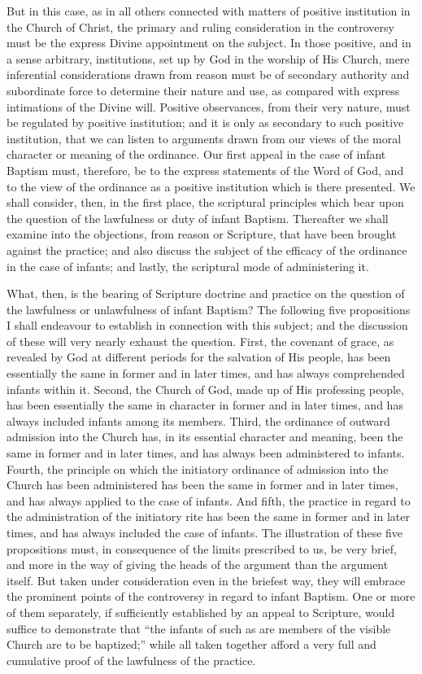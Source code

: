 \documentclass[]{book}
\begin{document}
But in this case, as in all others connected with matters of positive institution in the Church of Christ, the primary and ruling consideration in the controversy must be the express Divine appointment on the subject. In those positive, and in a sense arbitrary, institutions, set up by God in the worship of His Church, mere inferential considerations drawn from reason must be of secondary authority and subordinate force to determine their nature and use, as compared with express intimations of the Divine will. Positive observances, from their very nature, must be regulated by positive institution; and it is only as secondary to such positive institution, that we can listen to arguments drawn from our views of the moral character or meaning of the ordinance. Our first appeal in the case of infant Baptism must, therefore, be to the express statements of the Word of God, and to the view of the ordinance as a positive institution which is there presented. We shall consider, then, in the first place, the scriptural principles which bear upon the question of the lawfulness or duty of infant Baptism. Thereafter we shall examine into the objections, from reason or Scripture, that have been brought against the practice; and also discuss the subject of the efficacy of the ordinance in the case of infants; and lastly, the scriptural mode of administering it.

What, then, is the bearing of Scripture doctrine and practice on the question of the lawfulness or unlawfulness of infant Baptism? The following five propositions I shall endeavour to establish in connection with this subject; and the discussion of these will very nearly exhaust the question. First, the covenant of grace, as revealed by God at different periods for the salvation of His people, has been essentially the same in former and in later times, and has always comprehended infants within it. Second, the Church of God, made up of His professing people, has been essentially the same in character in former and in later times, and has always included infants among its members. Third, the ordinance of outward admission into the Church has, in its essential character and meaning, been the same in former and in later times, and has always been administered to infants. Fourth, the principle on which the initiatory ordinance of admission into the Church has been administered has been the same in former and in later times, and has always applied to the case of infants. And fifth, the practice in regard to the administration of the initiatory rite has been the same in former and in later times, and has always included the case of infants. The illustration of these five propositions must, in consequence of the limits prescribed to us, be very brief, and more in the way of giving the heads of the argument than the argument itself. But taken under consideration even in the briefest way, they will embrace the prominent points of the controversy in regard to infant Baptism. One or more of them separately, if sufficiently established by an appeal to Scripture, would suffice to demonstrate that ``the infants of such as are members of the visible Church are to be baptized;'' while all taken together afford a very full and cumulative proof of the lawfulness of the practice.
\end{document}
